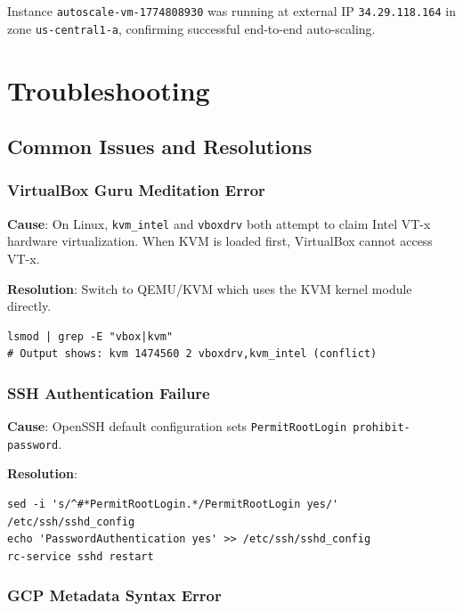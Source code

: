 \documentclass[12pt,a4paper]{article}
\begin{document}
Instance \texttt{autoscale-vm-1774808930} was running at external IP \texttt{34.29.118.164} in zone
\texttt{us-central1-a}, confirming successful end-to-end auto-scaling.

\section{Troubleshooting}

\subsection{Common Issues and Resolutions}

\subsubsection{VirtualBox Guru Meditation Error}

\textbf{Cause}: On Linux, \texttt{kvm\_intel} and \texttt{vboxdrv} both attempt to claim Intel VT-x
hardware virtualization. When KVM is loaded first, VirtualBox cannot access VT-x.

\textbf{Resolution}: Switch to QEMU/KVM which uses the KVM kernel module directly.

\begin{lstlisting}[style=bashstyle, caption={Verify KVM conflict}]
lsmod | grep -E "vbox|kvm"
# Output shows: kvm 1474560 2 vboxdrv,kvm_intel (conflict)
\end{lstlisting}

\subsubsection{SSH Authentication Failure}

\textbf{Cause}: OpenSSH default configuration sets \texttt{PermitRootLogin prohibit-password}.

\textbf{Resolution}:
\begin{lstlisting}[style=bashstyle]
sed -i 's/^#*PermitRootLogin.*/PermitRootLogin yes/' /etc/ssh/sshd_config
echo 'PasswordAuthentication yes' >> /etc/ssh/sshd_config
rc-service sshd restart
\end{lstlisting}

\subsubsection{GCP Metadata Syntax Error}
\end{document}
